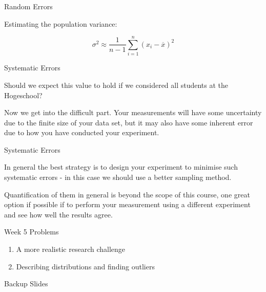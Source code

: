 \documentclass{beamer}
\begin{document}
\begin{frame}{Random Errors}

Estimating the population variance:

\begin{equation}
\sigma^{2} \approx \frac{1}{n-1}\sum^{n}_{i=1}(x_{i}-\overline{x})^{2}
\end{equation}



\end{frame}






\begin{frame}{Systematic Errors}

Should we expect this value to hold if we considered all students at the Hogeschool?

\vspace{5mm}

Now we get into the difficult part.  Your measurements will have some uncertainty due to the finite size of your data set, but it may also have some inherent error due to how you have conducted your experiment.

\end{frame}

\begin{frame}{Systematic Errors}


In general the best strategy is to design your experiment to minimise such systematic errors - in this case we should use a better sampling method.

\vspace{5mm}

Quantification of them in general is beyond the scope of this course, one great option if possible if to perform your measurement using a different experiment and see how well the results agree.


\end{frame}


\begin{frame}{Week 5 Problems}

\begin{enumerate}
\item A more realistic research challenge
\item Describing distributions and finding outliers
\end{enumerate}



\end{frame}





\appendix
{}
\setcounter{finalframe}{\value{framenumber}}

\begin{frame}{Backup Slides}
\end{frame}




\setcounter{framenumber}{\value{finalframe}}
\end{document}
